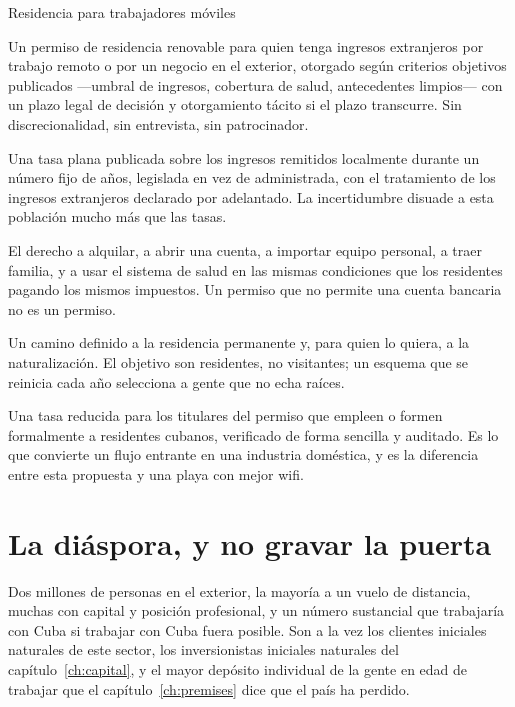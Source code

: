 \begin{design}{Residencia para trabajadores móviles}
\label{d:residence}
\begin{rules}
 Un permiso de residencia renovable para quien tenga ingresos extranjeros
por trabajo remoto o por un negocio en el exterior, otorgado según criterios objetivos
publicados ---umbral de ingresos, cobertura de salud, antecedentes limpios--- con un plazo
legal de decisión y otorgamiento tácito si el plazo transcurre. Sin discrecionalidad, sin
entrevista, sin patrocinador.

 Una tasa plana publicada sobre los ingresos remitidos localmente
durante un número fijo de años, legislada en vez de administrada, con el tratamiento de los
ingresos extranjeros declarado por adelantado. La incertidumbre disuade a esta población
mucho más que las tasas.

 El derecho a alquilar, a abrir una cuenta, a importar equipo
personal, a traer familia, y a usar el sistema de salud en las mismas condiciones que los
residentes pagando los mismos impuestos. Un permiso que no permite una cuenta bancaria no es
un permiso.

 Un camino definido a la residencia permanente y, para quien lo
quiera, a la naturalización. El objetivo son residentes, no visitantes; un esquema que se
reinicia cada año selecciona a gente que no echa raíces.

 Una tasa reducida para los titulares del permiso que empleen o formen
formalmente a residentes cubanos, verificado de forma sencilla y auditado. Es lo que convierte
un flujo entrante en una industria doméstica, y es la diferencia entre esta propuesta y una
playa con mejor wifi.
\end{rules}
\end{design}

\section{La diáspora, y no gravar la puerta}

Dos millones de personas en el exterior, la mayoría a un vuelo de distancia, muchas con
capital y posición profesional, y un número sustancial que trabajaría con Cuba si trabajar
con Cuba fuera posible. Son a la vez los clientes iniciales naturales de este sector, los
inversionistas iniciales naturales del capítulo~\ref{ch:capital}, y el mayor depósito
individual de la gente en edad de trabajar que el capítulo~\ref{ch:premises} dice que el país
ha perdido.

